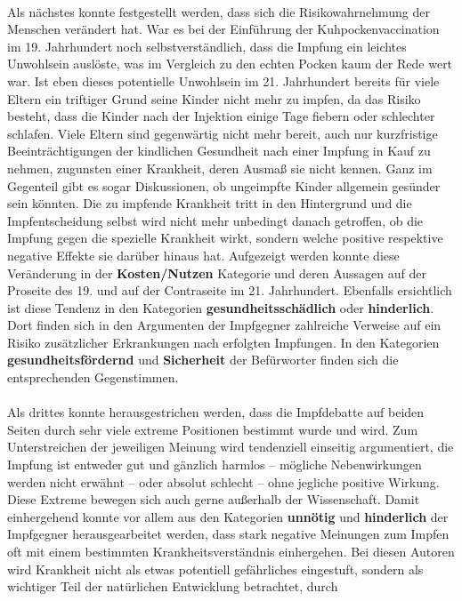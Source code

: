 \documentclass[
    a4paper,
    12pt,
    hyphens,
    chapterprefix=true,
    headheight=33pt,
    footheight=29pt,
    headings=optiontohead, %
]{scrartcl}
\begin{document}
{\\
Als nächstes konnte festgestellt werden, dass sich die Risikowahrnehmung der 
Menschen verändert hat. War es bei der Einführung der Kuhpockenvaccination im 19. Jahrhundert noch selbstverständlich, dass die Impfung ein leichtes Unwohlsein auslöste, was im Vergleich zu den echten Pocken kaum der Rede wert war. Ist eben dieses potentielle Unwohlsein im 21. Jahrhundert bereits für viele Eltern ein triftiger Grund seine Kinder nicht mehr zu impfen, da das Risiko besteht, dass die Kinder nach der Injektion einige Tage fiebern oder schlechter schlafen. Viele Eltern sind gegenwärtig nicht mehr bereit, auch nur kurzfristige Beeinträchtigungen der
kindlichen Gesundheit nach einer Impfung in Kauf zu nehmen, zugunsten einer 
Krankheit, deren Ausmaß sie nicht kennen. Ganz im Gegenteil gibt es sogar 
Diskussionen, ob ungeimpfte Kinder allgemein gesünder sein könnten. Die zu impfende Krankheit tritt in den Hintergrund und die Impfentscheidung selbst wird nicht mehr unbedingt danach getroffen, ob die Impfung gegen die spezielle Krankheit wirkt, sondern welche positive respektive negative Effekte sie darüber hinaus hat. Aufgezeigt werden konnte diese Veränderung in der \textbf{Kosten/Nutzen}
Kategorie und deren Aussagen auf der Proseite des 19. und auf der Contraseite 
im 21. Jahrhundert. Ebenfalls ersichtlich ist diese Tendenz in den Kategorien \textbf{gesundheitsschädlich} oder \textbf{hinderlich}. Dort finden sich in den Argumenten der Impfgegner zahlreiche Verweise auf ein Risiko zusätzlicher Erkrankungen nach erfolgten Impfungen. In den Kategorien \textbf{gesundheitsfördernd} und \textbf{Sicherheit} der Befürworter finden sich die entsprechenden Gegenstimmen. \\
\\
Als drittes konnte herausgestrichen werden, dass die Impfdebatte auf beiden 
Seiten durch sehr viele extreme Positionen bestimmt wurde und wird. Zum 
Unterstreichen der jeweiligen Meinung wird tendenziell einseitig 
argumentiert, die Impfung ist entweder gut und gänzlich harmlos -- mögliche 
Nebenwirkungen werden nicht erwähnt -- oder absolut schlecht -- ohne jegliche 
positive Wirkung. Diese Extreme bewegen sich auch gerne außerhalb der 
Wissenschaft. Damit einhergehend konnte vor allem aus den Kategorien \textbf{unnötig}
 und \textbf{hinderlich} der Impfgegner herausgearbeitet werden, dass stark negative Meinungen zum 
Impfen oft mit einem bestimmten Krankheitsverständnis einhergehen. Bei diesen 
Autoren wird Krankheit nicht als etwas potentiell gefährliches eingestuft, 
sondern als wichtiger Teil der natürlichen Entwicklung betrachtet, durch 
}
\end{document}
